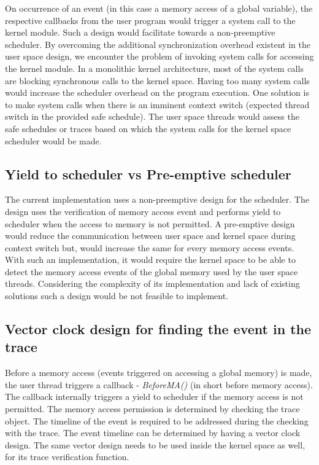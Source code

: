 On occurrence of an event (in this case a memory access of a global variable), the respective callbacks from the user program would trigger a system call to the kernel module. 
Such a design would facilitate towards a non-preemptive scheduler. 
By overcoming the additional synchronization overhead existent in the user space design, we encounter the problem of invoking system calls for accessing the kernel module. 
In a monolithic kernel architecture, most of the system calls are blocking synchronous calls to the kernel space. 
Having too many system calls would increase the scheduler overhead on the program execution. 
One solution is to make system calls when there is an imminent context switch (expected thread switch in the provided safe schedule). 
The user space threads would assess the safe schedules or traces based on which the system calls for the kernel space scheduler would be made. 

\subsection{Yield to scheduler vs Pre-emptive scheduler}

The current implementation uses a non-preemptive design for the scheduler. 
The design uses the verification of memory access event and performs yield to scheduler when the access to memory is not permitted. 
A pre-emptive design would reduce the communication between user space and kernel space during context switch but, would increase the same for every memory access events. 
With such an implementation, it would require the kernel space to be able to detect the memory access events of the global memory used by the user space threads. 
Considering the complexity of its implementation and lack of existing solutions such a design would be not feasible to implement. 


\subsection{Vector clock design for finding the event in the trace}

Before a memory access (events triggered on accessing a global memory) is made, the user thread triggers a callback - \emph{BeforeMA()} (in short before memory access). 
The callback internally triggers a yield to scheduler if the memory access is not permitted. 
The memory access permission is determined by checking the trace object. 
The timeline of the event is required to be addressed during the checking with the trace. 
The event timeline can be determined by having a vector clock design. 
The same vector design needs to be used inside the kernel space as well, for its trace verification function.